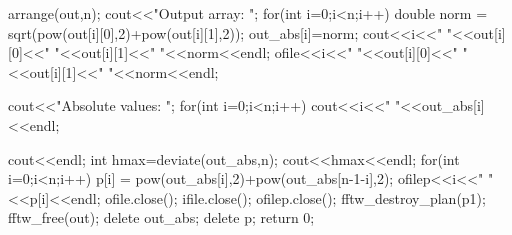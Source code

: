 \documentclass[a4,12pt,oneside]{report}
\newenvironment{sans}
	{\fontfamily{lmtt}
	 \selectfont
	 \verbatim
	 }
	 {
	 \endverbatim
	 \par
	 }
\begin{document}
\begin{sans}
{        	arrange(out,n);
        	cout<<"Output array: ";
        	for(int i=0;i<n;i++)
        	{
        	double norm = sqrt(pow(out[i][0],2)+pow(out[i][1],2));
        	out_abs[i]=norm;
        	cout<<i<<" "<<out[i][0]<<" "<<out[i][1]<<" "<<norm<<endl;
        	ofile<<i<<" "<<out[i][0]<<" "<<out[i][1]<<" "<<norm<<endl;
        	}
        	
        	cout<<"Absolute values: ";
        	for(int i=0;i<n;i++)
        	{
        	cout<<i<<" "<<out_abs[i]<<endl;
        	}
        	
        	cout<<endl;
        	int hmax=deviate(out_abs,n);
        	cout<<hmax<<endl;
        	for(int i=0;i<n;i++)
        	{
        	p[i] = pow(out_abs[i],2)+pow(out_abs[n-1-i],2);
        	ofilep<<i<<" "<<p[i]<<endl;
        	}
        	ofile.close();
        	ifile.close();
        	ofilep.close();
        	fftw_destroy_plan(p1);
        	fftw_free(out);
        	delete out_abs;
        	delete p;
        	return 0;
        	}
        \end{sans}
        
	
\end{document}
